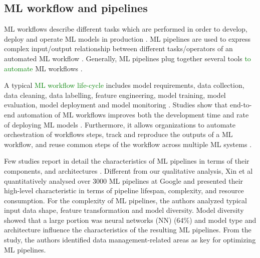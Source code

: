 \subsection{ML workflow and pipelines}

ML workflows describe different tasks which are performed in order to develop, deploy and operate ML models in production \cite{Amershi2019}. ML pipelines are used to express complex input/output relationship between 
different tasks/operators of an automated ML workflow \cite{Doris2021MLPipelines}. Generally, ML pipelines plug together several tools \textcolor{green}{to automate} ML workflows \cite{Hummer2019IBM}.

A typical \textcolor{green}{ML workflow life-cycle} includes model requirements, data collection, data cleaning, data labelling, feature engineering, model training, model evaluation, model deployment and model monitoring \cite{Amershi2019}. Studies show that end-to-end automation of ML workflows improves both the development time and rate of deploying ML models \cite{Hummer2019IBM,Doris2021MLPipelines}. Furthermore, it allows organizations to automate orchestration of workflows steps, track and reproduce the outputs of a ML workflow, and reuse common steps of the workflow across multiple ML systems \cite{Baylor2017, Hummer2019IBM}. %

Few studies report in detail the characteristics of ML pipelines in terms of their components, and architectures \cite{Hummer2019IBM,Doris2021MLPipelines}. Different from our qualitative analysis, Xin et al \cite{Doris2021MLPipelines} quantitatively analysed over 3000 ML pipelines at Google and presented their high-level characteristic in terms of pipeline lifespan, complexity, and resource consumption. For the complexity of ML pipelines, the authors analyzed typical input data shape, feature transformation and model diversity. Model diversity showed that a large portion was neural networks (NN) (64\%) and model type and architecture influence the characteristics of the resulting ML pipelines. %
From the study, the authors \cite{Doris2021MLPipelines} identified data management-related areas as key for optimizing ML pipelines. %

